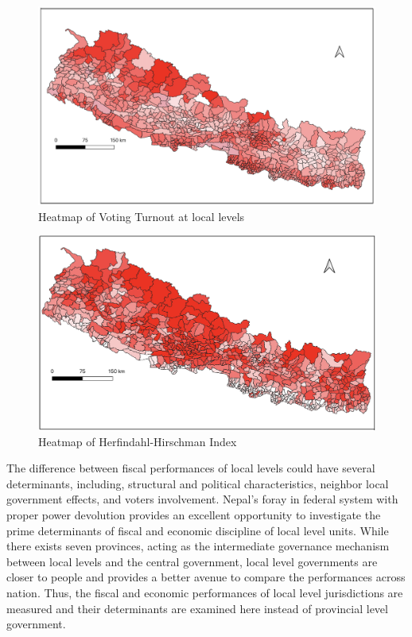 \begin{figure}[hptb]
\centering
\hspace{-1.2cm}
\includegraphics[width = 170mm, scale = 0.38]{figure/vote1.png}
\caption{Heatmap of Voting Turnout at local levels}
\label{Heatmap of Voting turnout}
\end{figure}
\begin{figure}[hptb]
\centering
\hspace{-1.5cm}
\includegraphics[width = 170mm, scale = 0.56]{figure/HHI.png}
\caption{Heatmap of Herfindahl-Hirschman Index}
\label{Heatmap of HH index}
\end{figure}
The difference between fiscal performances of local levels could have several determinants, including, structural and political characteristics\cite{Deborger1994}, neighbor local government effects\cite{Geys2006}, and voters involvement\cite{Geys2010}. Nepal's foray in federal system with proper power devolution provides an excellent opportunity to investigate the prime determinants of fiscal and economic discipline of local level units. While there exists seven provinces, acting as the intermediate governance mechanism between local levels and the central government, local level governments are closer to people and provides a better avenue to compare the performances across nation. Thus, the fiscal and economic performances of local level jurisdictions  are measured and their determinants are examined here instead of provincial level government. 
